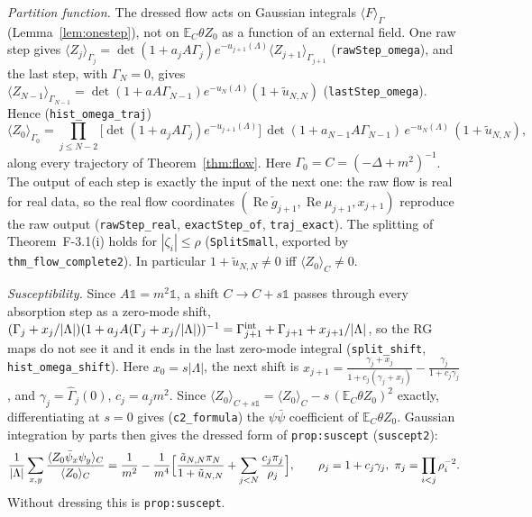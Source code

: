 \documentclass[11pt]{amsart}
\theoremstyle{definition}
\theoremstyle{remark}
\numberwithin{equation}{section}
\newcommand{\E}{\mathbb{E}}
\newcommand{\avg}[1]{\langle #1\rangle}
\begin{document}
\emph{Partition function.} The dressed flow acts on Gaussian integrals $\avg{F}_\Gamma$ (Lemma~\ref{lem:onestep}), not on
$\E_C\theta Z_0$ as a function of an external field. One raw step gives
$\avg{Z_j}_{\Gamma_j}=\det(1+a_jA\Gamma_j)e^{-u_{j+1}(\Lambda)}\avg{Z_{j+1}}_{\Gamma_{j+1}}$ (\texttt{rawStep\_omega}), and the last
step, with $\Gamma_N=0$, gives $\avg{Z_{N-1}}_{\Gamma_{N-1}}=\det(1+aA\Gamma_{N-1})e^{-u_N(\Lambda)}(1+\tilde u_{N,N})$
(\texttt{lastStep\_omega}). Hence (\texttt{hist\_omega\_traj})
\[
  \avg{Z_0}_{\Gamma_0}=\prod_{j\le N-2}\bigl[\det(1+a_jA\Gamma_j)e^{-u_{j+1}(\Lambda)}\bigr]\,
  \det(1+a_{N-1}A\Gamma_{N-1})\,e^{-u_N(\Lambda)}\,(1+\tilde u_{N,N}),
\]
along every trajectory of Theorem~\ref{thm:flow}. Here $\Gamma_0=C=(-\Delta+m^2)^{-1}$. The output of each step is exactly the input of
the next one: the raw flow is real for real data, so the real flow coordinates $(\operatorname{Re}\check g_{j+1},\operatorname{Re}\mu_{j+1},x_{j+1})$
reproduce the raw output (\texttt{rawStep\_real}, \texttt{exactStep\_of}, \texttt{traj\_exact}). The splitting of Theorem~F-3.1(i) holds for
$|\zeta_i|\le\rho$ (\texttt{SplitSmall}, exported by \texttt{thm\_flow\_complete2}). In particular $1+\tilde u_{N,N}\ne0$ iff
$\avg{Z_0}_C\ne0$.

\emph{Susceptibility.} Since $A\mathbb 1=m^2\mathbb 1$, a shift $C\to C+s\mathbb 1$ passes through every absorption step as a zero-mode shift,
$(\Gamma_j+x_j/|\Lambda|)(1+a_jA(\Gamma_j+x_j/|\Lambda|))^{-1}=\Gamma^{\rm int}_{j+1}+\Gamma_{j+1}+x_{j+1}/|\Lambda|$, so the RG maps do not see it
and it ends in the last zero-mode integral (\texttt{split\_shift}, \texttt{hist\_omega\_shift}). Here $x_0=s|\Lambda|$, the next shift is
$x_{j+1}=\frac{\gamma_j+x_j}{1+c_j(\gamma_j+x_j)}-\frac{\gamma_j}{1+c_j\gamma_j}$, and $\gamma_j=\hat\Gamma_j(0)$, $c_j=a_jm^2$.
Since $\avg{Z_0}_{C+s\mathbb 1}=\avg{Z_0}_C-s\,(\E_C\theta Z_0)^2$ exactly, differentiating at $s=0$ gives (\texttt{c2\_formula}) the
$\psi\bar\psi$ coefficient of $\E_C\theta Z_0$. Gaussian integration by parts then gives the dressed form of \texttt{prop:suscept}
(\texttt{suscept2}):
\[
  \frac{1}{|\Lambda|}\sum_{x,y}\frac{\avg{Z_0\bar\psi_x\psi_y}_C}{\avg{Z_0}_C}
  =\frac1{m^2}-\frac1{m^4}\Bigl[\frac{\tilde a_{N,N}\pi_N}{1+\tilde u_{N,N}}+\sum_{j<N}\frac{c_j\pi_j}{\rho_j}\Bigr],\qquad
  \rho_j=1+c_j\gamma_j,\ \pi_j=\prod_{i<j}\rho_i^{-2}.
\]
Without dressing this is \texttt{prop:suscept}.
\end{document}

